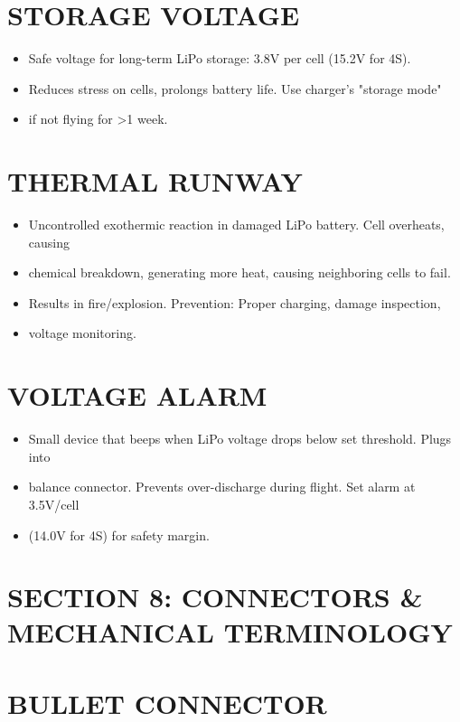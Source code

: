 \documentclass[11pt,letterpaper]{article}
\begin{document}
\section{STORAGE VOLTAGE}

\begin{itemize}
  \item Safe voltage for long-term LiPo storage: 3.8V per cell (15.2V for 4S).
  \item Reduces stress on cells, prolongs battery life. Use charger's "storage mode"
  \item if not flying for >1 week.
\end{itemize}

\section{THERMAL RUNWAY}

\begin{itemize}
  \item Uncontrolled exothermic reaction in damaged LiPo battery. Cell overheats, causing
  \item chemical breakdown, generating more heat, causing neighboring cells to fail.
  \item Results in fire/explosion. Prevention: Proper charging, damage inspection,
  \item voltage monitoring.
\end{itemize}

\section{VOLTAGE ALARM}

\begin{itemize}
  \item Small device that beeps when LiPo voltage drops below set threshold. Plugs into
  \item balance connector. Prevents over-discharge during flight. Set alarm at 3.5V/cell
  \item (14.0V for 4S) for safety margin.
\end{itemize}

\section{SECTION 8: CONNECTORS \& MECHANICAL TERMINOLOGY}

\section{BULLET CONNECTOR}
\end{document}
